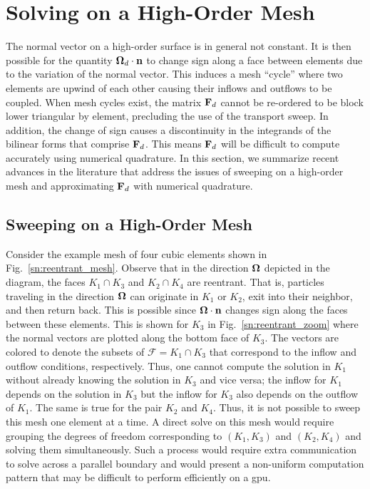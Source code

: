 \documentclass[../doc.tex]{subfiles}
\begin{document}
\section{Solving on a High-Order Mesh} \label{sn_sec:hosweep}
The normal vector on a high-order surface is in general not constant. It is then possible for the quantity $\boldsymbol{\Omega}_d\cdot\boldsymbol{\mathrm{n}}$ to change sign along a face between elements due to the variation of the normal vector. 
This induces a mesh ``cycle'' where two elements are upwind of each other causing their inflows and outflows to be coupled. 
When mesh cycles exist, the matrix $\boldsymbol{\mathrm{F}}_d$ cannot be re-ordered to be block lower triangular by element, precluding the use of the transport sweep. 
In addition, the change of sign causes a discontinuity in the integrands of the bilinear forms that comprise $\boldsymbol{\mathrm{F}}_d$. This means $\boldsymbol{\mathrm{F}}_d$ will be difficult to compute accurately using numerical quadrature. In this section, we summarize recent advances in the literature that address the issues of sweeping on a high-order mesh and approximating $\boldsymbol{\mathrm{F}}_d$ with numerical quadrature. 

\subsection{Sweeping on a High-Order Mesh}
Consider the example mesh of four cubic elements shown in Fig.~\ref{sn:reentrant_mesh}. 
Observe that in the direction $\boldsymbol{\Omega}$ depicted in the diagram, the faces $K_1 \cap K_3$ and $K_2 \cap K_4$ are reentrant. That is, particles traveling in the direction $\boldsymbol{\Omega}$ can originate in $K_1$ or $K_2$, exit into their neighbor, and then return back. This is possible since $\boldsymbol{\Omega}\cdot\boldsymbol{\mathrm{n}}$ changes sign along the faces between these elements. This is shown for $K_3$ in Fig.~\ref{sn:reentrant_zoom} where the normal vectors are plotted along the bottom face of $K_3$. The vectors are colored to denote the subsets of $\mathcal{F} = K_1\cap K_3$ that correspond to the inflow and outflow conditions, respectively. Thus, one cannot compute the solution in $K_1$ without already knowing the solution in $K_3$ and vice versa; the inflow for $K_1$ depends on the solution in $K_3$ but the inflow for $K_3$ also depends on the outflow of $K_1$. The same is true for the pair $K_2$ and $K_4$. Thus, it is not possible to sweep this mesh one element at a time. A direct solve on this mesh would require grouping the degrees of freedom corresponding to $(K_1, K_3)$ and $(K_2,K_4)$ and solving them simultaneously. Such a process would require extra communication to solve across a parallel boundary and would present a non-uniform computation pattern that may be difficult to perform efficiently on a \gls{gpu}.  
\end{document}
